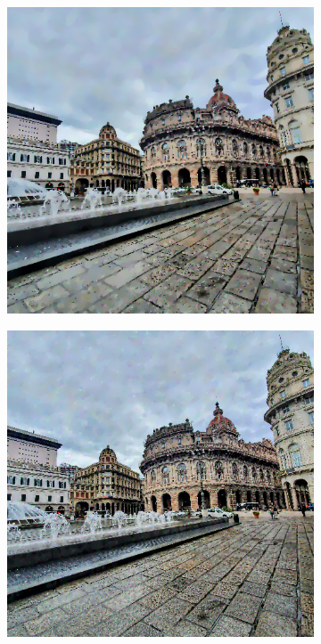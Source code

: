 \begin{figure}
	\begin{minipage}{\textwidth}%
		\begin{subfigure}{.3\textwidth}%
			\includegraphics[width=\textwidth]{atelier/breg_cat/cat-50.png}%
		\end{subfigure}\hfill%
		\begin{subfigure}{.3\textwidth}%
			\includegraphics[width=\textwidth]{atelier/breg_cat/cat-95.png}%

\end{subfigure}
\end{minipage}
\end{figure}
